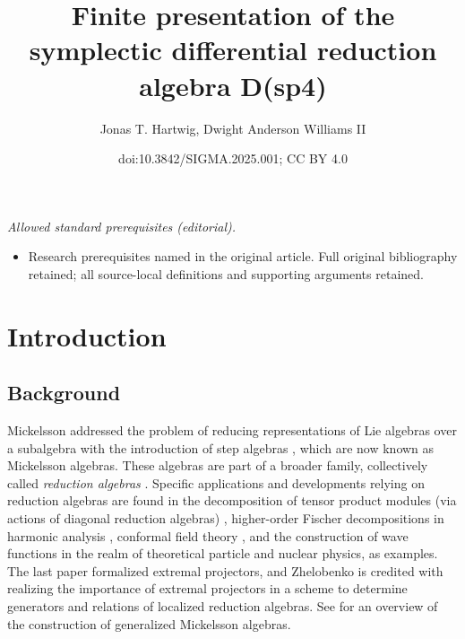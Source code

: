 \documentclass[10pt,a4paper]{amsart}
\title{Finite presentation of the symplectic differential reduction algebra D(sp4)}
\author{Jonas T. Hartwig, Dwight Anderson Williams II}
\date{doi:10.3842/SIGMA.2025.001; CC BY 4.0}
\numberwithin{equation}{section}
\begin{document}
\maketitle
\noindent\textit{Allowed standard prerequisites (editorial).}\begin{itemize}
\item Research prerequisites named in the original article. Full original bibliography retained; all source-local definitions and supporting arguments retained.
\end{itemize}\medskip
\section{Introduction}\label{sec:Intro}

\subsection{Background}\label{subsec:Background}
Mickelsson addressed the problem of reducing representations of Lie algebras over a subalgebra with the introduction of step algebras \cite{mickelssonStepAlgebrasSemisimple1973}, which are now known as Mickelsson algebras. These algebras are part of a broader family, collectively called \emph{reduction algebras} \cite{khoroshkinDiagonalReductionAlgebras2010}.
Specific applications and developments relying on reduction algebras are found in the decomposition of tensor product modules (via actions of diagonal reduction algebras) \cite{hartwigDiagonalReductionAlgebra2022c,khoroshkinDiagonalReductionAlgebras2010}, higher-order Fischer decompositions in harmonic analysis \cite{debieHarmonicTransvectorAlgebra2017}, conformal field theory \cite{conleyBoundedLengthRepresentations2001,conleyConformalSymbolsAction2009}, and the construction of wave functions \cite{asherovaProjectionOperatorsSimple1973} in the realm of theoretical particle and nuclear physics, as examples. The last paper formalized extremal projectors, and Zhelobenko \cite{zhelobenkoExtremalProjectorsGeneralized1989} is credited with realizing the importance of extremal projectors in a scheme to determine generators and relations of localized reduction algebras. See \cite{zhelobenkoPrincipalStructuresMethods2006} for an overview of the construction of generalized Mickelsson algebras.
\end{document}
